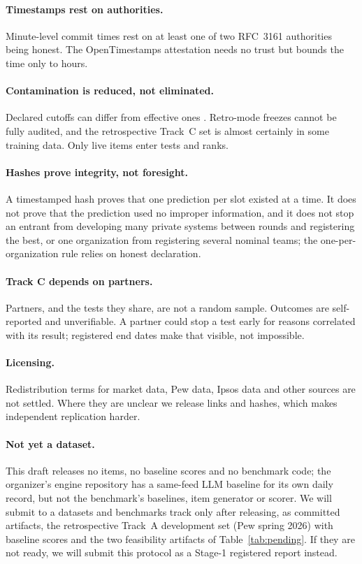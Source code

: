 \documentclass[11pt]{article}
\begin{document}
\paragraph{Timestamps rest on authorities.} Minute-level commit times rest on at least one of two RFC~3161 authorities being honest. The OpenTimestamps attestation needs no trust but bounds the time only to hours.

\paragraph{Contamination is reduced, not eliminated.} Declared cutoffs can differ from effective ones \citep{cheng2024dated}. Retro-mode freezes cannot be fully audited, and the retrospective Track~C set is almost certainly in some training data. Only live items enter tests and ranks.

\paragraph{Hashes prove integrity, not foresight.} A timestamped hash proves that one prediction per slot existed at a time. It does not prove that the prediction used no improper information, and it does not stop an entrant from developing many private systems between rounds and registering the best, or one organization from registering several nominal teams; the one-per-organization rule relies on honest declaration.

\paragraph{Track C depends on partners.} Partners, and the tests they share, are not a random sample. Outcomes are self-reported and unverifiable. A partner could stop a test early for reasons correlated with its result; registered end dates make that visible, not impossible.

\paragraph{Licensing.} Redistribution terms for market data, Pew data, Ipsos data and other sources are not settled. Where they are unclear we release links and hashes, which makes independent replication harder.

\paragraph{Not yet a dataset.} This draft releases no items, no baseline scores and no benchmark code; the organizer's engine repository has a same-feed LLM baseline for its own daily record, but not the benchmark's baselines, item generator or scorer. We will submit to a datasets and benchmarks track only after releasing, as committed artifacts, the retrospective Track~A development set (Pew spring 2026) with baseline scores and the two feasibility artifacts of Table~\ref{tab:pending}. If they are not ready, we will submit this protocol as a Stage-1 registered report instead.
\end{document}
